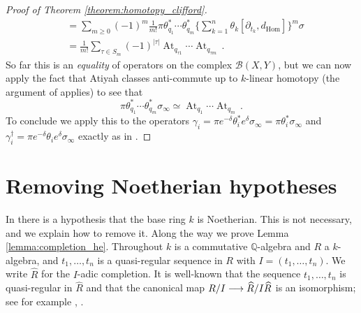 \documentclass[english,letter paper,12pt,leqno]{article}
\theoremstyle{example}
\numberwithin{equation}{section}
\def\BB{\mathcal{B}}
\def\Hom{\operatorname{Hom}}
\DeclareMathOperator{\At}{At}
\begin{document}
\begin{proof}[Proof of Theorem \ref{theorem:homotopy_clifford}]
\begin{align*}
&= \sum_{m \ge 0} (-1)^m \frac{1}{m!} \pi \theta_{q_1}^* \cdots \theta_{q_m}^* \Big\{ \sum_{k=1}^n \theta_k [\partial_{t_k}, d_{\Hom}] \Big\}^m \sigma\\
&= \frac{1}{m!} \sum_{\tau \in S_m} (-1)^{|\tau|} \At_{q_{\tau 1}} \cdots \At_{q_{\tau m}}\,.
\end{align*}
So far this is an \emph{equality} of operators on the complex $\BB(X,Y)$, but we can now apply the fact that Atiyah classes anti-commute up to $k$-linear homotopy (the argument of \cite[Theorem 3.11]{cut} applies) to see that
\[
\pi \theta_{q_1}^* \cdots \theta_{q_m}^* \sigma_\infty \simeq \At_{q_1} \cdots \At_{q_m}\,.
\]
To conclude we apply this to the operators $\gamma_i = \pi e^{-\delta} \theta_i^* e^\delta \sigma_\infty = \pi \theta_i^* \sigma_\infty$ and $\gamma_i^\dagger = \pi e^{-\delta} \theta_i e^\delta \sigma_\infty$ exactly as in \cite[Proposition 4.35]{cut}.
\end{proof}

\section{Removing Noetherian hypotheses}\label{section:noetherian}

In \cite{cut} there is a hypothesis that the base ring $k$ is Noetherian. This is not necessary, and we explain how to remove it. Along the way we prove Lemma \ref{lemma:completion_he}. Throughout $k$ is a commutative $\mathbb{Q}$-algebra and $R$ a $k$-algebra, and $t_1,\ldots,t_n$ is a quasi-regular sequence in $R$ with $I = (t_1,\ldots,t_n)$. We write $\widehat{R}$ for the $I$-adic completion. It is well-known that the sequence $t_1,\ldots,t_n$ is quasi-regular in $\widehat{R}$ and that the canonical map $R/I \longrightarrow \widehat{R}/I\widehat{R}$ is an isomorphism; see for example \cite[\S 15.B]{matsumura}, \cite[Chapitre $0$ \S 15.1]{EGA4}.
\end{document}
